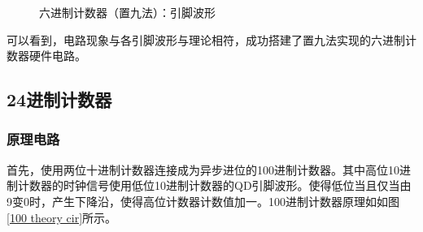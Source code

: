 \documentclass[UTF8]{ctexart}
\numberwithin{figure}{subsection}
\numberwithin{table}{subsection}
\numberwithin{equation}{subsection}
\begin{document}
\begin{figure}[H]
    \centering
    \caption{六进制计数器（置九法）：引脚波形}
    \label{6-9 osci}
\end{figure}

\par 可以看到，电路现象与各引脚波形与理论相符，成功搭建了置九法实现的六进制计数器硬件电路。


\subsection{24进制计数器}
\subsubsection{原理电路}
\par 首先，使用两位十进制计数器连接成为异步进位的100进制计数器。其中高位10进制计数器的时钟信号使用低位10进制计数器的QD引脚波形。使得低位当且仅当由9变0时，产生下降沿，使得高位计数器计数值加一。100进制计数器原理如如图
\ref{100 theory cir}所示。
\end{document}
